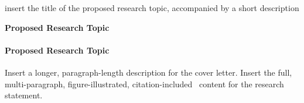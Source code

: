 %
%
	{insert the title of the proposed research topic, accompanied by a short description}
	{%
			{{\bf Proposed Research Topic}\\}
			{\paragraph{{P}roposed {R}esearch {T}opic}}
		{Insert a longer, paragraph-length description for the cover letter.}
		{Insert the full, multi-paragraph, figure-illustrated, citation-included~\cite{luo2020modeling} content for the research statement.}
	}